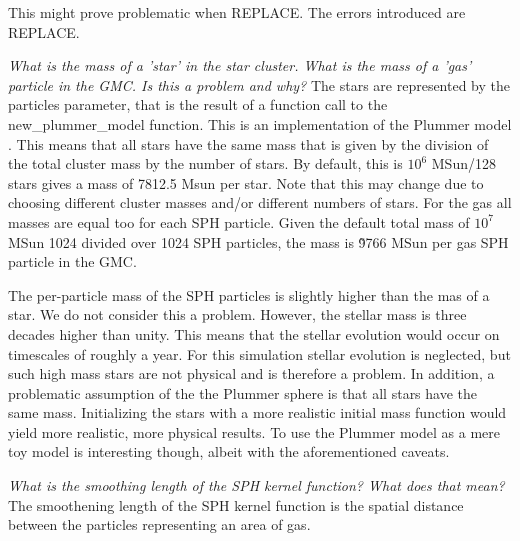 \documentclass{aa}
\begin{document}
This might prove problematic when REPLACE. The errors introduced are REPLACE.

\textit{What is the mass of a 'star' in the star cluster. What is the mass of a 'gas' particle in the GMC. Is this a problem and why?} The stars are represented by the particles parameter, that is the result of a function call to the new\_plummer\_model function. This is an implementation of the Plummer model \citep{1911MNRAS..71..460P}. This means that all stars have the same mass that is given by the division of the total cluster mass by the number of stars. By default, this is $10^6$ MSun/128 stars gives a mass of 7812.5 Msun per star. Note that this may change due to choosing different cluster masses and/or different numbers of stars. For the gas all masses are equal too for each SPH particle. Given the default total mass of $10^7$ MSun 1024 divided over 1024 SPH particles, the mass is \~9766 MSun per gas SPH particle in the GMC. 

The per-particle mass of the SPH particles is slightly higher than the mas of a star. We do not consider this a problem. However, the stellar mass is three decades higher than unity. This means that the stellar evolution would occur on timescales of roughly a year. For this simulation stellar evolution is neglected, but such high mass stars are not physical and is therefore a problem. In addition, a problematic assumption of the the Plummer sphere is that all stars have the same mass. Initializing the stars with a more realistic initial mass function would yield more realistic, more physical results. To use the Plummer model as a mere toy model is interesting though, albeit with the aforementioned caveats.

\textit{What is the smoothing length of the SPH kernel function? What does that mean?}
The smoothening length of the SPH kernel function is the spatial distance between the particles representing an area of gas.
\end{document}
